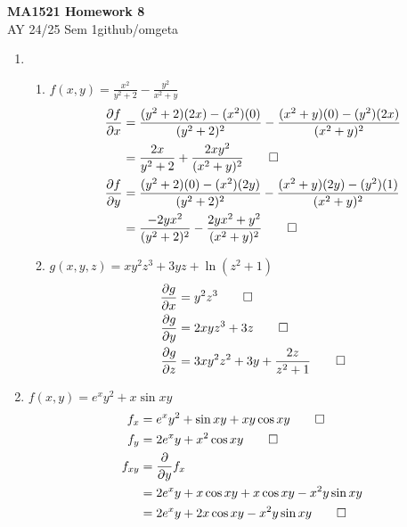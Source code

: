\documentclass[12pt, a4paper]{article}
\newcommand{\mytitle}{MA1521 Homework 8}
\newcommand{\myauthor}{github/omgeta}
\newcommand{\mydate}{AY 24/25 Sem 1}
\begin{document}
\raggedright
\footnotesize
\begin{center}
{\normalsize{\textbf{\mytitle}}} \\
{\footnotesize{\mydate\hspace{2pt}\textemdash\hspace{2pt}\myauthor}}
\end{center}

\begin{enumerate}[Q\arabic*.]
  \item 
    \begin{enumerate}[(\alph*)]
      \item $\displaystyle f(x, y) = \frac{x^2}{y^2+2} - \frac{y^2}{x^2+y}$
        \begin{align*}
          \frac{\partial f}{\partial x} &= \frac{(y^2+2)(2x) - (x^2)(0)}{(y^2+2)^2} - \frac{(x^2+y)(0) - (y^2)(2x)}{(x^2+y)^2} \\
                                        &= \frac{2x}{y^2 + 2} + \frac{2xy^2}{(x^2+y)^2}\qed\\
          \frac{\partial f}{\partial y} &= \frac{(y^2+2)(0) - (x^2)(2y)}{(y^2+2)^2} - \frac{(x^2+y)(2y) - (y^2)(1)}{(x^2+y)^2}\\
                                        &= \frac{-2yx^2}{(y^2+2)^2} - \frac{2yx^2+y^2}{(x^2+y)^2} \qed
        \end{align*}

      \item $\displaystyle g(x,y,z) = xy^2z^3 + 3yz + \ln(z^2+1)$
        \begin{align*}
          \frac{\partial g}{\partial x} &= y^2z^3 \qed\\
          \frac{\partial g}{\partial y} &= 2xyz^3 + 3z \qed\\
          \frac{\partial g}{\partial z} &= 3xy^2z^2 + 3y + \frac{2z}{z^2+1} \qed
        \end{align*}
    \end{enumerate}

  \item $f(x, y) = e^xy^2 + x\sin xy$
    \begin{align*}
      f_x &= e^xy^2 + \sin xy + xy \cos xy \qed\\
      f_y &= 2e^xy + x^2\cos xy \qed\\
      f_{xy} &= \frac{\partial}{\partial y} f_x \\
             &= 2e^xy + x\cos xy + x\cos xy - x^2y\sin xy\\
             &= 2e^xy + 2x\cos xy - x^2y\sin xy \qed
    \end{align*}


\end{enumerate}
\end{document}
